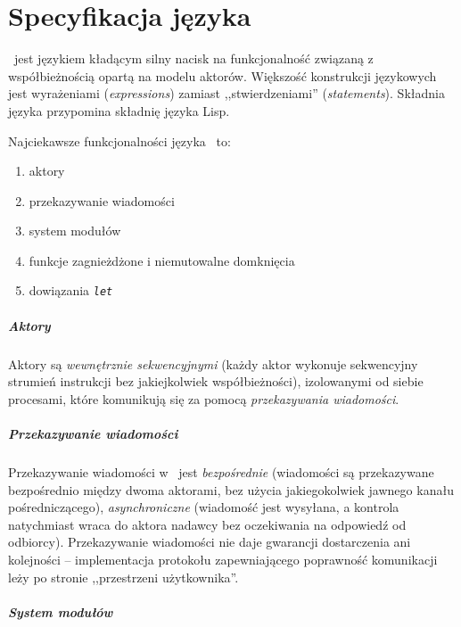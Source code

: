 \chapter{Specyfikacja języka \ViuAct}
\label{viuact_spec}
\label{specyfikacja_jezyka_viuact} %

\ViuAct\ jest językiem kładącym silny nacisk na funkcjonalność związaną z współbieżnością opartą na modelu
aktorów. Większość konstrukcji językowych jest wyrażeniami (\emph{expressions}) zamiast ,,stwierdzeniami''
(\emph{statements}). Składnia języka przypomina składnię języka Lisp.

Najciekawsze funkcjonalności języka \ViuAct\ to:

\begin{enumerate}
    \item aktory
    \item przekazywanie wiadomości
    \item system modułów
    \item funkcje zagnieżdżone i niemutowalne domknięcia
    \item dowiązania \emph{\texttt{let}}
\end{enumerate}

\paragraph*{Aktory}

Aktory są \emph{wewnętrznie sekwencyjnymi} (każdy aktor wykonuje sekwencyjny strumień instrukcji bez
jakiejkolwiek współbieżności), izolowanymi od siebie procesami, które komunikują się za pomocą
\emph{przekazywania wiadomości}.

\paragraph*{Przekazywanie wiadomości}

Przekazywanie wiadomości w \ViuAct\ jest \emph{bezpośrednie} (wiadomości są
przekazywane bezpośrednio między dwoma aktorami, bez użycia jakiegokolwiek
jawnego kanału pośredniczącego), \emph{asynchroniczne} (wiadomość jest wysyłana,
a kontrola natychmiast wraca do aktora nadawcy bez oczekiwania na odpowiedź od
odbiorcy). Przekazywanie wiadomości nie daje gwarancji dostarczenia ani
kolejności -- implementacja protokołu zapewniającego poprawność komunikacji leży
po stronie ,,przestrzeni użytkownika''.

\paragraph*{System modułów}

